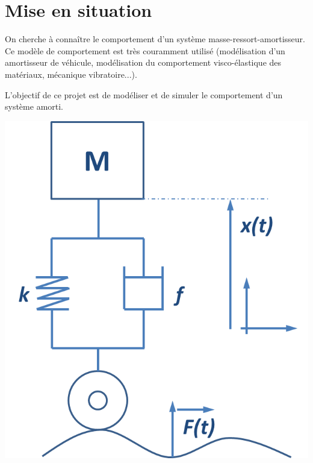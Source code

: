 \documentclass[10pt]{article}
\newif\ifxp
\begin{document}
\ifxp

\else

\fi



 \renewcommand{\baselinestretch}{1.2}
\setlength{\parskip}{2ex plus 0.5ex minus 0.2ex}



\section{Mise en situation}
\begin{minipage}[c]{.77\linewidth}
On cherche à connaître le comportement d'un système masse-ressort-amortisseur. Ce modèle de comportement est très couramment utilisé (modélisation d'un amortisseur de véhicule, modélisation du comportement visco-élastique des matériaux, mécanique vibratoire...).
\begin{obj}
L'objectif de ce projet est de modéliser et de simuler le comportement d'un système amorti.
\end{obj}
\end{minipage} \hfill
\begin{minipage}[c]{.2\linewidth}
\includegraphics[width=\textwidth]{images/schema}
\end{minipage}
\end{document}
